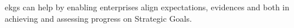 %
%
\Glspl{ekg} can help by enabling enterprises align expectations, evidences and
 both in achieving and assessing progress on Strategic Goals.
